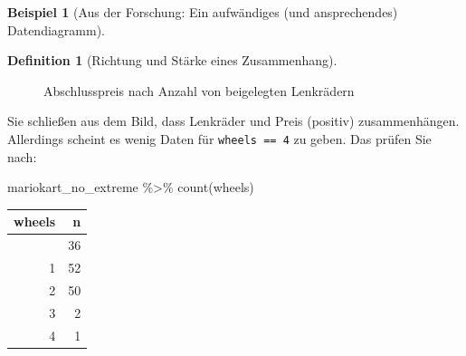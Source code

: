 \documentclass[
  a4paper,
]{scrbook}
\newenvironment{Shaded}{\begin{snugshade}}{\end{snugshade}}
\newcommand{\FunctionTok}[1]{\textcolor[rgb]{0.28,0.35,0.67}{#1}}
\newcommand{\NormalTok}[1]{\textcolor[rgb]{0.00,0.23,0.31}{#1}}
\newcommand{\SpecialCharTok}[1]{\textcolor[rgb]{0.37,0.37,0.37}{#1}}
\theoremstyle{definition}
\newtheorem{example}{Beispiel}[chapter]
\theoremstyle{definition}
\newtheorem{definition}{Definition}[chapter]
\theoremstyle{definition}
\theoremstyle{remark}
\begin{document}
\begin{example}[Aus der Forschung: Ein aufwändiges (und ansprechendes)
Datendiagramm]
\begin{definition}[Richtung und Stärke eines
Zusammenhang]
\begin{figure}
\begin{minipage}{0.50\linewidth}
{}


\end{minipage}%
%
\begin{minipage}{0.50\linewidth}



\end{minipage}%

\caption{\label{fig-box-wheels1}Abschlusspreis nach Anzahl von
beigelegten Lenkrädern}

\end{figure}%

Sie schließen aus dem Bild, dass Lenkräder und Preis (positiv)
zusammenhängen. Allerdings scheint es wenig Daten für
\texttt{wheels\ ==\ 4} zu geben. Das prüfen Sie nach:

\begin{Shaded}
\begin{Highlighting}[]
\NormalTok{mariokart\_no\_extreme }\SpecialCharTok{\%\textgreater{}\%} 
  \FunctionTok{count}\NormalTok{(wheels)}
\end{Highlighting}
\end{Shaded}

\begin{longtable}[]{@{}rr@{}}
\toprule\noalign{}
wheels & n \\
\midrule\noalign{}
\endhead
\bottomrule\noalign{}
\endlastfoot
0 & 36 \\
1 & 52 \\
2 & 50 \\
3 & 2 \\
4 & 1 \\
\end{longtable}


\end{definition}
\end{example}
\end{document}
